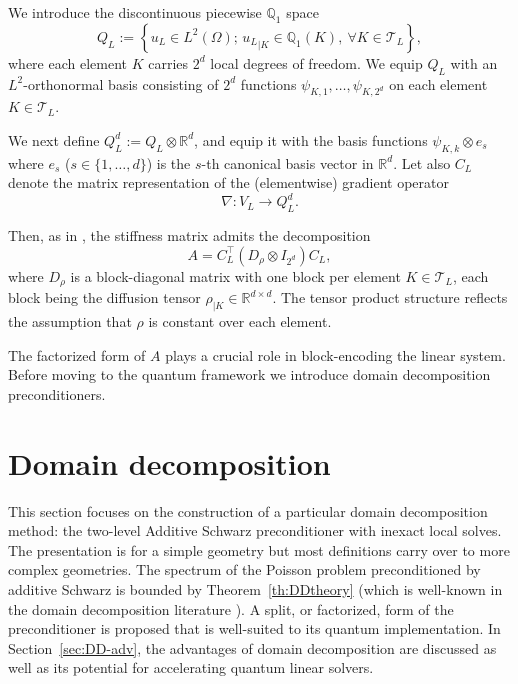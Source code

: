 \documentclass[onefignum,onetabnum]{siamart251216}
\begin{document}
We introduce the discontinuous piecewise $\mathbb Q_1$ space
\begin{equation}
\label{eq:QL}
Q_L := \left\{u_L \in L^2(\Omega);\, {u_L}_{|K} \in \mathbb Q_1(K), \ \forall K \in \mathcal{T}_L \right\},
\end{equation}
where each element $K$ carries $2^d$ local degrees of freedom. We equip $Q_L$ with an $L^2$-orthonormal basis consisting of $2^d$ functions
$\psi_{K,1}, \dots, \psi_{K,2^d}$ on each element $K \in \mathcal{T}_L$.

We next define $Q_L^d := Q_L \otimes \mathbb{R}^d$, and equip it with the basis functions $\psi_{K,k} \otimes e_s $ where $e_s$ ($s \in \{1, \dots, d\}$) is the $s$-th canonical basis vector in $\mathbb R^{d}$. 
Let also $C_L$ denote the matrix representation of the (elementwise) gradient operator
\[
\nabla : V_L \to Q_L^d.
\]

Then, as in \cite{Deiml_2025}, the stiffness matrix admits the decomposition
\begin{equation}
A = C_L^\top (D_\rho \otimes I_{2^d}) C_L,
\label{eq:decomposition_stiffness_matrix}
\end{equation}
where $D_\rho$ is a block-diagonal matrix with one block per element $K \in \mathcal{T}_L$, each block being the diffusion tensor $\rho_{|K} \in \mathbb{R}^{d \times d}$. The tensor product structure reflects the assumption that $\rho$ is constant over each element.

The factorized form of $A$ plays a crucial role in block-encoding the linear system. Before moving to the quantum framework we introduce domain decomposition preconditioners.  

\section{Domain decomposition}
\label{sec:DD}

 This section focuses on the construction of a particular domain decomposition method: the two-level Additive Schwarz preconditioner with inexact local solves. The presentation is for a simple geometry but most definitions carry over to more complex geometries. The spectrum of the Poisson problem preconditioned by additive Schwarz is bounded by Theorem~\ref{th:DDtheory} (which is well-known in the domain decomposition literature \cite{zbMATH02113718}). A split, or factorized, form of the preconditioner is proposed that is well-suited to its quantum implementation. In Section~\ref{sec:DD-adv}, the advantages of domain decomposition are discussed as well as its potential for accelerating quantum linear solvers. 
\end{document}
